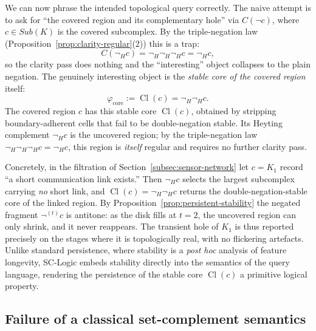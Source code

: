 \documentclass[final,12pt]{elsarticle}
\theoremstyle{plain}
\theoremstyle{definition}
\begin{document}
We can now phrase the intended topological query correctly. The
naive attempt is to ask for ``the covered region and its complementary
hole'' via $C(\neg c)$, where $c\in Sub(K)$ is the covered subcomplex.
By the triple-negation law
(Proposition~\ref{prop:clarity-regular}(2)) this is a trap:
\[
C(\neg_H c)=\neg_H\neg_H\neg_H c=\neg_H c,
\]
so the clarity pass does nothing and the ``interesting'' object collapses
to the plain negation. The genuinely interesting object is the
\emph{stable core of the covered region} itself:
\[
\varphi_{\mathrm{core}}:=\mathop{\mathrm{Cl}}(c)=\neg_H\neg_H c .
\]
The covered region $c$ has this stable core $\mathop{\mathrm{Cl}}(c)$, obtained by
stripping boundary-adherent cells that fail to be double-negation
stable. Its Heyting complement $\neg_H c$ is the uncovered region;
by the triple-negation law $\neg_H\neg_H\neg_H c=\neg_H c$, this region
is \emph{itself} regular and requires no further clarity pass.

Concretely, in the filtration of Section~\ref{subsec:sensor-network} let \(c=K_1\) record ``a short
communication link exists.'' Then $\neg_H c$ selects the largest
subcomplex carrying \emph{no} short link, and \(\mathop{\mathrm{Cl}}(c)=\neg_H\neg_H c\)
returns the double-negation-stable core of the linked region. By
Proposition~\ref{prop:persistent-stability} the negated fragment
$\neg^{(t)}c$ is antitone: as the disk fills at $t=2$, the uncovered
region can only shrink, and it never reappears. The transient hole of
$K_1$ is thus reported precisely on the stages where it is
topologically real, with no flickering artefacts.
Unlike standard persistence, where stability is a \emph{post hoc} analysis of
feature longevity, SC-Logic embeds stability directly into the semantics of the
query language, rendering the persistence of the stable core
\(\mathop{\mathrm{Cl}}(c)\) a primitive logical property.

\subsection{Failure of a classical set-complement semantics}
\label{subsec:why-not-classical}
\end{document}
